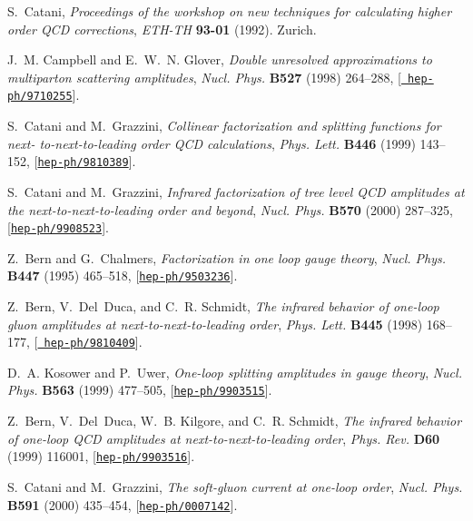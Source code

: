 \documentclass[paper,notoc,nohyper]{JHEP3}
\begin{document}
\begin{thebibliography}{10}
S.~Catani, {\it Proceedings of the workshop on new techniques for calculating
  higher order {QCD} corrections},  {\em ETH-TH} {\bf 93-01} (1992). Zurich.

J.~M. Campbell and E.~W.~N. Glover, {\it Double unresolved approximations to
  multiparton scattering amplitudes},  {\em Nucl. Phys.} {\bf B527} (1998)
  264--288, [\href{http://xxx.lanl.gov/abs/hep-ph/9710255}{{\tt
  hep-ph/9710255}}].

S.~Catani and M.~Grazzini, {\it Collinear factorization and splitting functions
  for next- to-next-to-leading order {QCD} calculations},  {\em Phys. Lett.}
  {\bf B446} (1999) 143--152,
  [\href{http://xxx.lanl.gov/abs/hep-ph/9810389}{{\tt hep-ph/9810389}}].

S.~Catani and M.~Grazzini, {\it Infrared factorization of tree level {QCD}
  amplitudes at the next-to-next-to-leading order and beyond},  {\em Nucl.
  Phys.} {\bf B570} (2000) 287--325,
  [\href{http://xxx.lanl.gov/abs/hep-ph/9908523}{{\tt hep-ph/9908523}}].

Z.~Bern and G.~Chalmers, {\it Factorization in one loop gauge theory},  {\em
  Nucl. Phys.} {\bf B447} (1995) 465--518,
  [\href{http://xxx.lanl.gov/abs/hep-ph/9503236}{{\tt hep-ph/9503236}}].

Z.~Bern, V.~Del~Duca, and C.~R. Schmidt, {\it The infrared behavior of one-loop
  gluon amplitudes at next-to-next-to-leading order},  {\em Phys. Lett.} {\bf
  B445} (1998) 168--177, [\href{http://xxx.lanl.gov/abs/hep-ph/9810409}{{\tt
  hep-ph/9810409}}].

D.~A. Kosower and P.~Uwer, {\it One-loop splitting amplitudes in gauge theory},
   {\em Nucl. Phys.} {\bf B563} (1999) 477--505,
  [\href{http://xxx.lanl.gov/abs/hep-ph/9903515}{{\tt hep-ph/9903515}}].

Z.~Bern, V.~Del~Duca, W.~B. Kilgore, and C.~R. Schmidt, {\it The infrared
  behavior of one-loop {QCD} amplitudes at next-to-next-to-leading order},
  {\em Phys. Rev.} {\bf D60} (1999) 116001,
  [\href{http://xxx.lanl.gov/abs/hep-ph/9903516}{{\tt hep-ph/9903516}}].

S.~Catani and M.~Grazzini, {\it The soft-gluon current at one-loop order},
  {\em Nucl. Phys.} {\bf B591} (2000) 435--454,
  [\href{http://xxx.lanl.gov/abs/hep-ph/0007142}{{\tt hep-ph/0007142}}].


\end{thebibliography}
\end{document}
